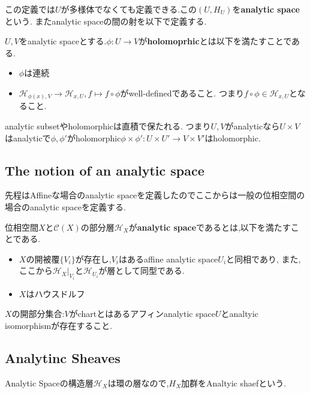 この定義では$U$が多様体でなくても定義できる.この$(U,H_U)$を\textbf{analytic space}という.
またanalytic spaceの間の射を以下で定義する.
\begin{screen}
\begin{dfn}
 $U,V$をanalytic spaceとする.$\phi: U \to V$が\textbf{holomoprhic}とは以下を満たすことである.
 \begin{itemize}
   \item $\phi$は連続
   \item $\mathcal{H}_{\phi(x), V} \to \mathcal{H}_{x, U}, f \mapsto f \circ \phi$がwell-definedであること.
         つまり$f \circ \phi \in \mathcal{H}_{x, U}$となること.
 \end{itemize}
\end{dfn}
\end{screen}

analytic subsetやholomorphicは直積で保たれる.
つまり$U, V$がanalyticなら$U \times V$はanalyticで$\phi, \phi'$がholomorphic$\phi \times \phi' : U \times U' \to V \times V'$はholomorphic.

\subsection{The notion of an analytic space}
先程はAffineな場合のanalytic spaceを定義したのでここからは一般の位相空間の場合のanalytic spaceを定義する.

\begin{screen}
\begin{dfn}
 位相空間$X$と$\mathcal{C}(X)$の部分層$\mathcal{H}_X$が\textbf{analytic space}であるとは,以下を満たすことである.
 \begin{itemize}
   \item $X$の開被覆$\{V_i\}$が存在し,$V_i$はあるaffine analytic space$U_i$と同相であり,
   また,ここから$\mathcal{H}_X|_{V_i}$と$\mathcal{H}_{U_i}$が層として同型である.
   \item $X$はハウスドルフ
 \end{itemize}
\end{dfn}
\end{screen}
$X$の開部分集合:$V$がchartとはあるアフィンanalytic space$U$とanaltyic isomorphismが存在すること.

\subsection{Analytinc Sheaves}
Analytic Spaceの構造層$\mathcal{H}_X$は環の層なので,$H_X$加群をAnaltyic shaefという.

